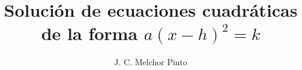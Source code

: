 \documentclass[12pt]{guia}
\title{Solución de ecuaciones cuadráticas de la forma $a(x-h)^2=k$}
\author{J. C. Melchor Pinto}
\begin{document}
\pagestyle{plain}
\addpoints
\INFO
\begin{questions}
    
    \newpage
    
\end{questions}

\vfill
\puntuacion
\end{document}
